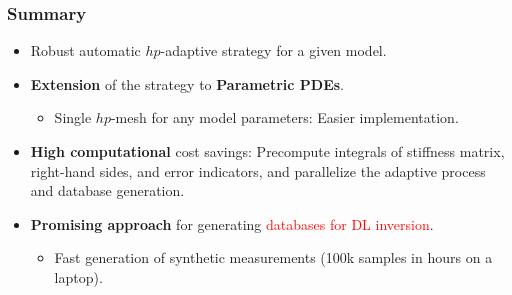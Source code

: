 \documentclass[10pt,aspectratio=169]{beamer}
\begin{document}
\begin{frame}
	\frametitle{Summary}
	
	\begin{itemize}
		\item Robust automatic $hp$-adaptive strategy for a given model.
	\end{itemize}
	
	\vspace{5mm}
	
	\begin{itemize}
		\item \textbf{Extension} of the strategy to \textbf{Parametric PDEs}.
		\begin{itemize}
			\item Single $hp$-mesh for any model parameters: Easier implementation.
		\end{itemize}
	\end{itemize}
	
	\vspace{5mm}
	
	\begin{itemize}
		\item \textbf{High computational} cost savings: Precompute integrals of stiffness matrix, right-hand sides, and error indicators, and parallelize the adaptive process and database generation.
	\end{itemize}
	
	\vspace{5mm}
	
	\begin{itemize}
		\item \textbf{Promising approach} for generating \textcolor{red}{databases for DL inversion}.
		\begin{itemize}
			\item Fast generation of synthetic measurements (100k samples in hours on a laptop).
		\end{itemize}
	\end{itemize}
	
\end{frame}
\end{document}
